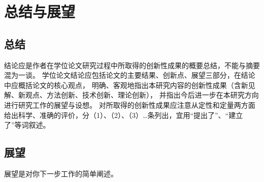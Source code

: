 
\chapter{总结与展望}


\section{总结}

结论应是作者在学位论文研究过程中所取得的创新性成果的概要总结，不能与摘要混为一谈。
学位论文结论应包括论文的主要结果、创新点、展望三部分，在结论中应概括论文的核心观点，
明确、客观地指出本研究内容的创新性成果（含新见解、新观点、方法创新、技术创新、理论创新），
并指出今后进一步在本研究方向进行研究工作的展望与设想。
对所取得的创新性成果应注意从定性和定量两方面给出科学、准确的评价，分（1）、（2）、（3）…条列出，宜用“提出了”、“建立了”等词叙述。

\section{展望}
展望是对你下一步工作的简单阐述。


